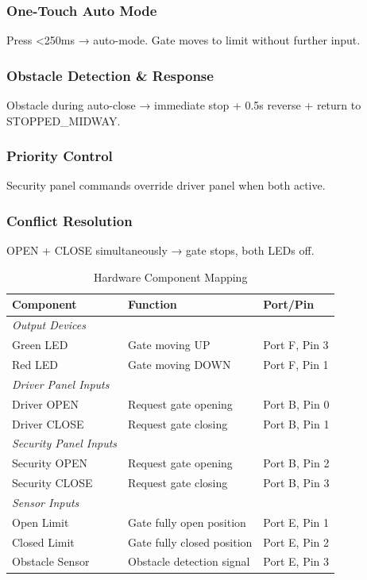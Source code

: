 \documentclass[11pt,a4paper]{article}
\begin{document}
\subsubsection{One-Touch Auto Mode}
Press \textless{}250ms → auto-mode. Gate moves to limit without further input.

\subsubsection{Obstacle Detection \& Response}
Obstacle during auto-close → immediate stop + 0.5s reverse + return to STOPPED\_MIDWAY.

\subsubsection{Priority Control}
Security panel commands override driver panel when both active.

\subsubsection{Conflict Resolution}
OPEN + CLOSE simultaneously → gate stops, both LEDs off.

\begin{table}[H]
\centering
\small
\begin{tabularx}{\textwidth}{lll}
\toprule
\textbf{Component} & \textbf{Function} & \textbf{Port/Pin} \\
\midrule
\textit{Output Devices} \\
Green LED & Gate moving UP & Port F, Pin 3 \\
Red LED & Gate moving DOWN & Port F, Pin 1 \\
\textit{Driver Panel Inputs} \\
Driver OPEN & Request gate opening & Port B, Pin 0 \\
Driver CLOSE & Request gate closing & Port B, Pin 1 \\
\textit{Security Panel Inputs} \\
Security OPEN & Request gate opening & Port B, Pin 2 \\
Security CLOSE & Request gate closing & Port B, Pin 3 \\
\textit{Sensor Inputs} \\
Open Limit & Gate fully open position & Port E, Pin 1 \\
Closed Limit & Gate fully closed position & Port E, Pin 2 \\
Obstacle Sensor & Obstacle detection signal & Port E, Pin 3 \\
\bottomrule
\end{tabularx}
\caption{Hardware Component Mapping}
\label{tab:hardware}
\end{table}
\end{document}
